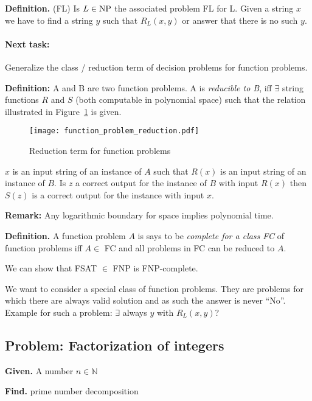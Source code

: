 \documentclass[a4paper]{article}
\newcommand{\given}[1]{\textbf{Given.} #1\par}
\newcommand{\find}[1]{\textbf{Find.} #1\par}
\newcommand{\cls}[1]{\rm{#1}}
\newenvironment{spec}[0]{\begin{framed}}{\end{framed}}
\begin{document}
\textbf{Definition.} (FL) Is $L \in \cls{NP}$ the associated problem FL for L.
Given a string $x$ we have to find a string $y$ such that $R_L(x,y)$ or answer that
there is no such $y$.

\paragraph{Next task:} Generalize the class / reduction term of decision problems for function problems.

\textbf{Definition:} A and B are two function problems. A is \emph{reducible to B}, iff $\exists$ string functions $R$ and $S$ (both computable in polynomial space) such that the relation illustrated in Figure~\ref{fig:function-problem-reduction} is given.

\begin{figure}[ht]
  \begin{center}
    \texttt{[image: function\_problem\_reduction.pdf]}
    \caption{Reduction term for function problems}
    \label{fig:function-problem-reduction}
  \end{center}
\end{figure}

$x$ is an input string of an instance of $A$ such that $R(x)$ is an input string of an instance
of $B$. Is $z$ a correct output for the instance of $B$ with input $R(x)$ then $S(z)$ is a
correct output for the instance with input $x$.

\textbf{Remark:} Any logarithmic boundary for space implies polynomial time.

\textbf{Definition.} A function problem $A$ is says to be \emph{complete for a class
FC} of function problems iff $A \in$ FC and all problems in FC can be reduced to $A$.

We can show that FSAT $\in$ F\cls{NP} is F\cls{NP}-complete.

We want to consider a special class of function problems. They are problems for which there
are always valid solution and as such the answer is never ``No''. Example for such a problem:
$\exists$ always $y$ with $R_L(x,y)$?

\subsection{Problem: Factorization of integers}
\label{sec:integer-factorization}
%
\begin{spec}
  \given{A number $n \in \mathbb{N}$}
  \find{prime number decomposition}
\end{spec}
\end{document}
